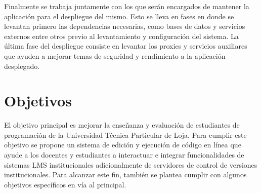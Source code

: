 Finalmente se trabaja juntamente con los que serán encargados de mantener la aplicación para el despliegue del mismo. Esto se lleva en fases en donde se levantan primero las dependencias necesarias, como bases de datos y servicios externos entre otros previo al levantamiento y configuración del sistema. La última fase del despliegue consiste en levantar los proxies y servicios auxiliares que ayuden a mejorar temas de seguridad y rendimiento a la aplicación desplegado.

\section{Objetivos}
El objetivo principal es mejorar la enseñanza y evaluación de estudiantes de programación de la Universidad Técnica Particular de Loja. Para cumplir este objetivo se propone un sistema de edición y ejecución de código en línea que ayude a los docentes y estudiantes a interactuar 
e integrar funcionalidades de sistemas LMS  institucionales adicionalmente de servidores de control de versiones institucionales. Para alcanzar este fin, también se plantea cumplir con algunos objetivos específicos en vía al principal. 

